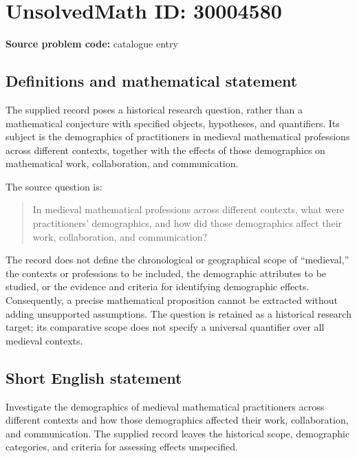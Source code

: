 \documentclass[11pt]{article}
\begin{document}
\section*{UnsolvedMath ID: 30004580}
\textbf{Source problem code:} catalogue entry
\subsection{Definitions and mathematical statement}
The supplied record poses a historical research question, rather than a mathematical conjecture with specified objects, hypotheses, and quantifiers. Its subject is the demographics of practitioners in medieval mathematical professions across different contexts, together with the effects of those demographics on mathematical work, collaboration, and communication.

The source question is:
\begin{quote}
In medieval mathematical professions across different contexts, what were practitioners' demographics, and how did those demographics affect their work, collaboration, and communication?
\end{quote}

The record does not define the chronological or geographical scope of ``medieval,'' the contexts or professions to be included, the demographic attributes to be studied, or the evidence and criteria for identifying demographic effects. Consequently, a precise mathematical proposition cannot be extracted without adding unsupported assumptions. The question is retained as a historical research target; its comparative scope does not specify a universal quantifier over all medieval contexts.
\subsection{Short English statement}
Investigate the demographics of medieval mathematical practitioners across different contexts and how those demographics affected their work, collaboration, and communication. The supplied record leaves the historical scope, demographic categories, and criteria for assessing effects unspecified.
\end{document}
